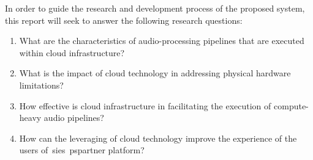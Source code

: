 In order to guide the research and development process of the proposed system, this report will seek to answer the following research questions:

\begin{enumerate}
    \item What are the characteristics of audio-processing pipelines that are executed within cloud infrastructure?
    \item What is the impact of cloud technology in addressing physical hardware limitations?
    \item How effective is cloud infrastructure in facilitating the execution of compute-heavy audio pipelines?
    \item How can the leveraging of cloud technology improve the experience of the users of~\glspl{sie}~\gls{pspartner} platform?
\end{enumerate}